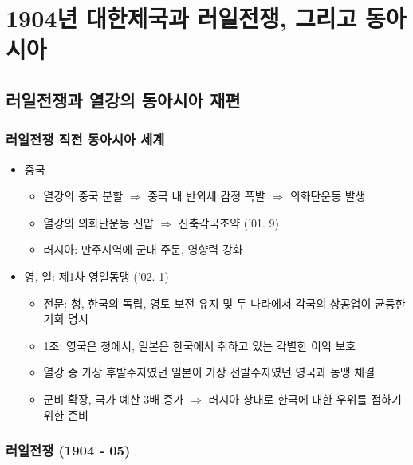 \section{1904년 대한제국과 러일전쟁, 그리고 동아시아}

\subsection{러일전쟁과 열강의 동아시아 재편}

\subsubsection*{러일전쟁 직전 동아시아 세계}

\begin{itemize}
    \item 중국
    \begin{itemize}
        \item 열강의 중국 분할 $\Rightarrow$ 중국 내 반외세 감정 폭발 $\Rightarrow$ 의화단운동 발생
        \item 열강의 의화단운동 진압 $\Rightarrow$ 신축각국조약 ('01. 9)
        \item 러시아: 만주지역에 군대 주둔, 영향력 강화
    \end{itemize}
    \item 영, 일: 제1차 영일동맹 ('02. 1)
    \begin{itemize}
        \item 전문: 청, 한국의 독립, 영토 보전 유지 및 두 나라에서 각국의 상공업이 균등한 기회 명시
        \item 1조: 영국은 청에서, 일본은 한국에서 취하고 있는 각별한 이익 보호
        \item 열강 중 가장 후발주자였던 일본이 가장 선발주자였던 영국과 동맹 체결
        \item 군비 확장, 국가 예산 3배 증가 $\Rightarrow$ 러시아 상대로 한국에 대한 우위를 점하기 위한 준비
    \end{itemize}
\end{itemize}

\subsubsection*{러일전쟁 (1904 - 05)}


